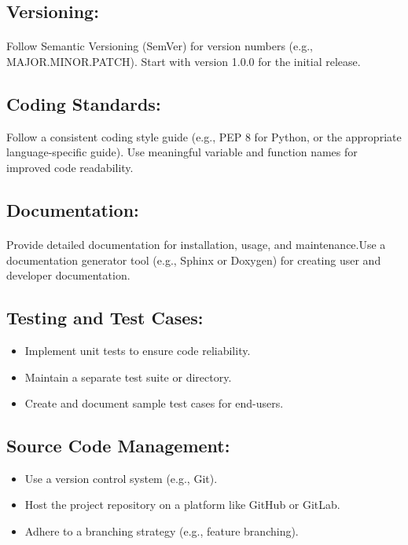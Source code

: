 \documentclass{article}
\begin{document}
\subsection{Versioning:}
\paragraph{}
Follow Semantic Versioning (SemVer) for version numbers (e.g., MAJOR.MINOR.PATCH).
Start with version 1.0.0 for the initial release.

\subsection{Coding Standards:}
Follow a consistent coding style guide (e.g., PEP 8 for Python, or the appropriate
language-specific guide). Use meaningful variable and function names for improved
code readability.

\subsection{Documentation:}
\paragraph{}
Provide detailed documentation for installation, usage, and maintenance.Use a
documentation generator tool (e.g., Sphinx or Doxygen) for creating user and developer
documentation.

\subsection{Testing and Test Cases:}
\begin{itemize}
    \item Implement unit tests to ensure code reliability.
    \item Maintain a separate test suite or directory.
    \item Create and document sample test cases for end-users.
\end{itemize}

\subsection{Source Code Management:}
\begin{itemize}
    \item Use a version control system (e.g., Git).
    \item Host the project repository on a platform like GitHub or GitLab.
    \item Adhere to a branching strategy (e.g., feature branching).
\end{itemize}
\end{document}
